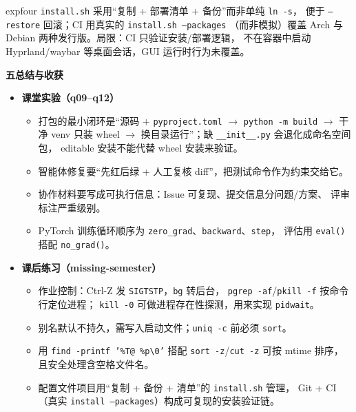 \documentclass[11pt,a4paper,fontset=none]{ctexart}
\newcommand{\partbanner}[3]{%
  \par\vspace{1.6em}
  \begin{tcolorbox}[enhanced, colback=#1!10, colframe=#1!85!black,
    boxrule=1pt, arc=3pt, left=8pt, right=8pt, top=6pt, bottom=6pt,
    before skip=1.6em]
    {\Large\bfseries\color{#1!70!black}#2\qquad #3}
  \end{tcolorbox}
  \par\vspace{0.2em}\noindent\ignorespaces
}
\begin{document}
\begin{trapbox}{expfour}
  \texttt{install.sh} 采用“复制 + 部署清单 + 备份”而非单纯 \texttt{ln -s}，
  便于 \texttt{--restore} 回滚；CI 用真实的 \texttt{install.sh --packages}
  （而非模拟）覆盖 Arch 与 Debian 两种发行版。局限：CI 只验证安装/部署逻辑，
  不在容器中启动 Hyprland/waybar 等桌面会话，GUI 运行时行为未覆盖。
\end{trapbox}

\partbanner{expone}{五}{总结与收获}
\begin{itemize}[leftmargin=1.4em, itemsep=2pt]
  \item \textbf{课堂实验（q09--q12）}
  \begin{itemize}[leftmargin=1.6em, itemsep=1pt]
    \item 打包的最小闭环是“源码 + \texttt{pyproject.toml} $\rightarrow$
          \texttt{python -m build} $\rightarrow$ 干净 venv 只装 wheel $\rightarrow$
          换目录运行”；缺 \texttt{\_\_init\_\_.py} 会退化成命名空间包，
          editable 安装不能代替 wheel 安装来验证。
    \item 智能体修复要“先红后绿 + 人工复核 diff”，把测试命令作为约束交给它。
    \item 协作材料要写成可执行信息：Issue 可复现、提交信息分问题/方案、
          评审标注严重级别。
    \item PyTorch 训练循环顺序为 \texttt{zero\_grad}、\texttt{backward}、\texttt{step}，
          评估用 \texttt{eval()} 搭配 \texttt{no\_grad()}。
  \end{itemize}
  \item \textbf{课后练习（missing-semester）}
  \begin{itemize}[leftmargin=1.6em, itemsep=1pt]
    \item 作业控制：Ctrl-Z 发 \texttt{SIGTSTP}，\texttt{bg} 转后台，
          \texttt{pgrep -af}/\texttt{pkill -f} 按命令行定位进程；
          \texttt{kill -0} 可做进程存在性探测，用来实现 \texttt{pidwait}。
    \item 别名默认不持久，需写入启动文件；\texttt{uniq -c} 前必须 \texttt{sort}。
    \item 用 \texttt{find -printf '\%T@ \%p\textbackslash0'} 搭配
          \texttt{sort -z}/\texttt{cut -z} 可按 mtime 排序，且安全处理含空格文件名。
    \item 配置文件项目用“复制 + 备份 + 清单”的 \texttt{install.sh} 管理，
          Git + CI（真实 \texttt{install --packages}）构成可复现的安装验证链。
  \end{itemize}
\end{itemize}
\end{document}
